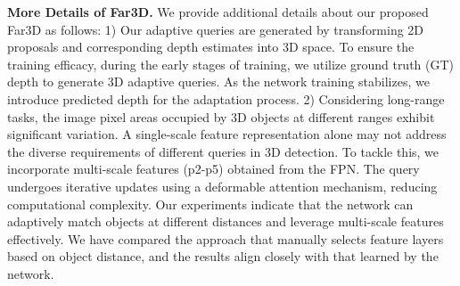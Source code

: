 \documentclass[letterpaper]{article} \usepackage{aaai24}
\begin{document}
\noindent\textbf{More Details of Far3D.}
We provide additional details about our proposed Far3D as follows:
1) Our adaptive queries are generated by transforming 2D proposals and corresponding depth estimates into 3D space. To ensure the training efficacy, during the early stages of training, we utilize ground truth (GT) depth to generate 3D adaptive queries. As the network training stabilizes, we introduce predicted depth for the adaptation process. 
2) Considering long-range tasks, the image pixel areas occupied by 3D objects at different ranges exhibit significant variation. A single-scale feature representation alone may not address the diverse requirements of different queries in 3D detection. To tackle this, we incorporate multi-scale features (p2-p5) obtained from the FPN. The query undergoes iterative updates using a deformable attention mechanism, reducing computational complexity. Our experiments indicate that the network can adaptively match objects at different distances and leverage multi-scale features effectively. We have compared the approach that manually selects feature layers based on object distance, and the results align closely with that learned by the network.




%
 
\end{document}
